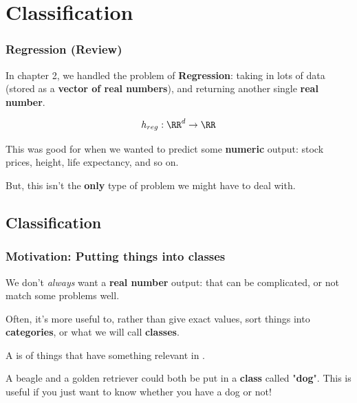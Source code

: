 \setcounter{chapter}{3}

\chapter{Classification}

    \subsection{Regression (Review)}
    
        In chapter 2, we handled the problem of \textbf{Regression}: taking in lots of data (stored as a \textbf{vector of real numbers}), and returning another single \textbf{real number}.
        
        \begin{equation}
            h_{reg}: \RR^d \rightarrow \RR
        \end{equation}
        
        This was good for when we wanted to predict some \textbf{numeric} output: stock prices, height, life expectancy, and so on.
        
        But, this isn't the \textbf{only} type of problem we might have to deal with.

\section{Classification}

    \subsection{Motivation: Putting things into classes}
        
        We don't \textit{always} want a \textbf{real number} output: that can be complicated, or not match some problems well. 
        
        Often, it's more useful to, rather than give exact values, sort things into \textbf{categories}, or what we will call \textbf{classes}.\\
        
        \begin{definition}
            A  is  of things that have something relevant in .
        \end{definition}
        
        \miniex A beagle and a golden retriever could both be put in a \textbf{class} called "\textbf{dog}". This is useful if you just want to know whether you have a dog or not!
        
